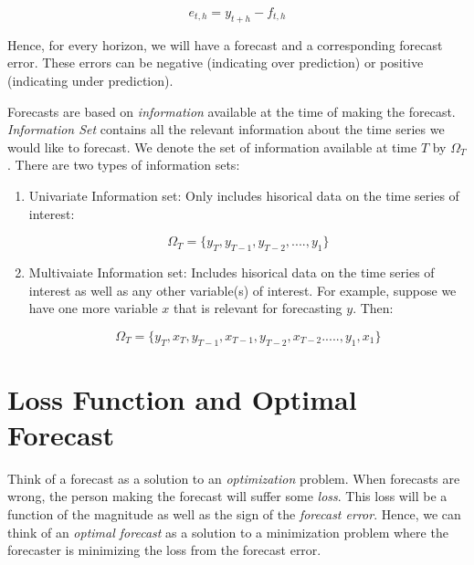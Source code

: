 \documentclass[]{book}
\providecommand{\tightlist}{%
  \setlength{\itemsep}{0pt}\setlength{\parskip}{0pt}}
\theoremstyle{definition}
\theoremstyle{definition}
\theoremstyle{definition}
\theoremstyle{remark}
\let\BeginKnitrBlock\begin \let\EndKnitrBlock\end
\begin{document}
\begin{equation}
e_{t,h}=y_{t+h}-f_{t,h}
\end{equation}

Hence, for every horizon, we will have a forecast and a corresponding
forecast error. These errors can be negative (indicating over
prediction) or positive (indicating under prediction).

\BeginKnitrBlock{definition}[Information Set]
\protect\hypertarget{def:d4}{}{\label{def:d4} \iffalse (Information Set)
\fi{} }
\EndKnitrBlock{definition}

Forecasts are based on \emph{information} available at the time of
making the forecast. \emph{Information Set} contains all the relevant
information about the time series we would like to forecast. We denote
the set of information available at time \(T\) by \(\Omega_T\). There
are two types of information sets:

\begin{enumerate}
\def\labelenumi{\arabic{enumi}.}
\tightlist
\item
  Univariate Information set: Only includes hisorical data on the time
  series of interest:

  \begin{equation}
  \Omega_T=\{y_T, y_{T-1}, y_{T-2}, ...., y_1\}
  \end{equation}
\item
  Multivaiate Information set: Includes hisorical data on the time
  series of interest as well as any other variable(s) of interest. For
  example, suppose we have one more variable \(x\) that is relevant for
  forecasting \(y\). Then:

  \begin{equation}
  \Omega_T=\{y_T, x_T, y_{T-1}, x_{T-1}, y_{T-2},x_{T-2}. ...., y_1, x_1\}
  \end{equation}
\end{enumerate}

\section{Loss Function and Optimal
Forecast}\label{loss-function-and-optimal-forecast}

Think of a forecast as a solution to an \emph{optimization} problem.
When forecasts are wrong, the person making the forecast will suffer
some \emph{loss}. This loss will be a function of the magnitude as well
as the sign of the \emph{forecast error}. Hence, we can think of an
\emph{optimal forecast} as a solution to a minimization problem where
the forecaster is minimizing the loss from the forecast error.
\end{document}
